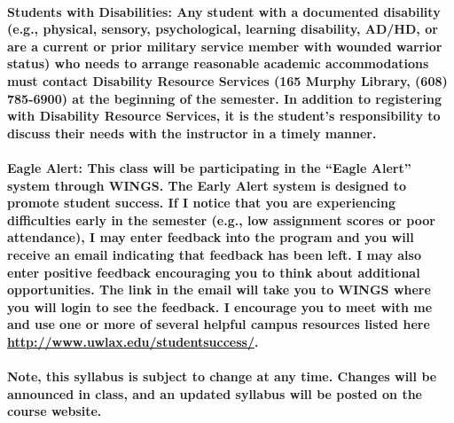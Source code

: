 \documentclass [10pt]{article}
\begin{document}
\ \\
\bfseries Students with Disabilities: \normalfont Any student with a documented disability (e.g., physical, sensory, psychological, learning disability, AD/HD, or are a current or prior military service member with wounded warrior status) who needs to arrange reasonable academic accommodations must contact Disability Resource Services (165 Murphy Library, (608) 785-6900) at the beginning of the semester. In addition to registering with Disability Resource Services, it is the student’s responsibility to discuss their needs with the instructor in a timely manner. \\
\ \\
\bfseries Eagle Alert: \normalfont This class will be participating in the “Eagle Alert” system through WINGS. The Early Alert system is designed to promote student success. If I notice that you are experiencing difficulties early in the semester (e.g., low assignment scores or poor attendance), I may enter feedback into the program and you will receive an email indicating that feedback has been left.  I may also enter positive feedback encouraging you to think about additional opportunities. The link in the email will take you to WINGS where you will login to see the feedback. I encourage you to meet with me and use one or more of several helpful campus resources listed here \url{http://www.uwlax.edu/studentsuccess/}. \\
\ \\
Note, this syllabus is subject to change at any time. Changes will be announced in class, and an updated syllabus will be posted on the course website.

\vfill
\end{document}
